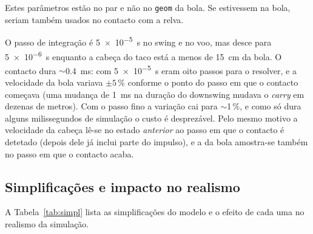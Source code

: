 \documentclass[11pt,a4paper]{article}
\begin{document}
Estes parâmetros estão no par e não no \texttt{geom} da bola. Se estivessem na
bola, seriam também usados no contacto com a relva.

O passo de integração é \SI{5e-5}{\second} no swing e no voo, mas desce para
\SI{5e-6}{\second} enquanto a cabeça do taco está a menos de \SI{15}{\centi\meter}
da bola. O contacto dura $\sim$\SI{0.4}{\milli\second}: com \SI{5e-5}{\second}
eram oito passos para o resolver, e a velocidade da bola variava $\pm5\,\%$
conforme o ponto do passo em que o contacto começava (uma mudança de
\SI{1}{\milli\second} na duração do downswing mudava o \emph{carry} em
dezenas de metros). Com o passo fino a variação cai para $\sim$1\,\%, e como
só dura alguns milissegundos de simulação o custo é desprezável. Pelo mesmo
motivo a velocidade da cabeça lê-se no estado \emph{anterior} ao passo em que o
contacto é detetado (depois dele já inclui parte do impulso), e a da bola
amostra-se também no passo em que o contacto acaba.

\subsection{Simplificações e impacto no realismo}

A Tabela~\ref{tab:simpl} lista as simplificações do modelo e o efeito de cada
uma no realismo da simulação.
\suppressfloats[t]
\end{document}
